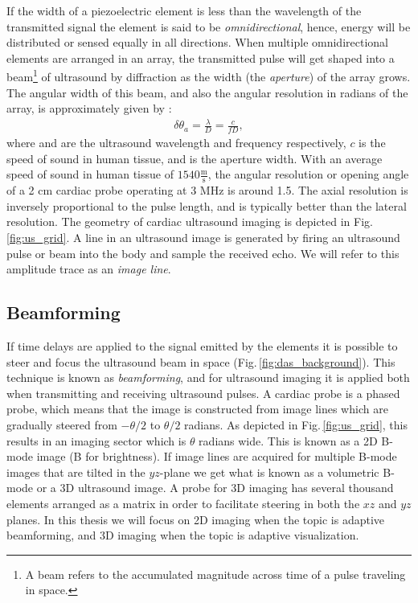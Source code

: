 If the width of a piezoelectric element is less than the wavelength of the transmitted signal the element is said to be \textit{omnidirectional}, hence, energy will be distributed or sensed equally in all directions. When multiple omnidirectional elements are arranged in an array, the transmitted pulse will get shaped into a beam\footnote{A beam refers to the accumulated magnitude across time of a pulse traveling in space.} of ultrasound by diffraction as the width (the \textit{aperture}) of the array grows. The angular width of this beam, and also the angular resolution in radians of the array, is approximately given by \cite{AngelUltrasound}:
\begin{align}\label{eq:res}
\delta\theta_a = \frac{\lambda}{D} = \frac{c}{fD},
\end{align}
where  and  are the ultrasound wavelength and frequency respectively, $c$ is the speed of sound in human tissue, and  is the aperture width. With an average speed of sound in human tissue of $1540\frac{\text{m}}{\text{s}}$, the angular resolution or opening angle of a 2 cm cardiac probe operating at 3 MHz is around 1.5\degree. The axial resolution is inversely proportional to the pulse length, and is typically better than the lateral resolution. The geometry of cardiac ultrasound imaging is depicted in Fig.\,\ref{fig:us_grid}. A line in an ultrasound image is generated by firing an ultrasound pulse or beam into the body and sample the received echo. We will refer to this amplitude trace as an \textit{image line}. 

\subsection{Beamforming}
If time delays are applied to the signal emitted by the elements it is possible to steer and focus the ultrasound beam in space (Fig.\,\ref{fig:das_background}). This technique is known as \textit{beamforming}, and for ultrasound imaging it is applied both when transmitting and receiving ultrasound pulses. A cardiac probe is a phased probe, which means that the image is constructed from image lines which are gradually steered from $-\theta/2$ to $\theta/2$ radians. As depicted in Fig.\,\ref{fig:us_grid}, this results in an imaging sector which is $\theta$ radians wide. This is known as a 2D B-mode image (B for brightness). If image lines are acquired for multiple B-mode images that are tilted in the $yz$-plane we get what is known as a volumetric B-mode or a 3D ultrasound image. A probe for 3D imaging has several thousand elements arranged as a matrix in order to facilitate steering in both the $xz$ and $yz$ planes. In this thesis we will focus on 2D imaging when the topic is adaptive beamforming, and 3D imaging when the topic is adaptive visualization.

